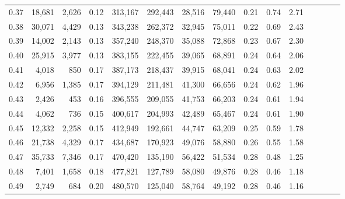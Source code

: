 \begin{tabular}{rrrcrrrrrrrrrrr}
0.37 &  18,681 &  2,626 &                                       0.12 &  313,167 &  292,443 &   28,516 &   79,440 &  0.21 &  0.74 &                         2.71 \\
0.38 &  30,071 &  4,429 &                                       0.13 &  343,238 &  262,372 &   32,945 &   75,011 &  0.22 &  0.69 &                         2.43 \\
0.39 &  14,002 &  2,143 &                                       0.13 &  357,240 &  248,370 &   35,088 &   72,868 &  0.23 &  0.67 &                         2.30 \\
0.40 &  25,915 &  3,977 &                                       0.13 &  383,155 &  222,455 &   39,065 &   68,891 &  0.24 &  0.64 &                         2.06 \\
0.41 &   4,018 &    850 &                                       0.17 &  387,173 &  218,437 &   39,915 &   68,041 &  0.24 &  0.63 &                         2.02 \\
0.42 &   6,956 &  1,385 &                                       0.17 &  394,129 &  211,481 &   41,300 &   66,656 &  0.24 &  0.62 &                         1.96 \\
0.43 &   2,426 &    453 &                                       0.16 &  396,555 &  209,055 &   41,753 &   66,203 &  0.24 &  0.61 &                         1.94 \\
0.44 &   4,062 &    736 &                                       0.15 &  400,617 &  204,993 &   42,489 &   65,467 &  0.24 &  0.61 &                         1.90 \\
0.45 &  12,332 &  2,258 &                                       0.15 &  412,949 &  192,661 &   44,747 &   63,209 &  0.25 &  0.59 &                         1.78 \\
0.46 &  21,738 &  4,329 &                                       0.17 &  434,687 &  170,923 &   49,076 &   58,880 &  0.26 &  0.55 &                         1.58 \\
0.47 &  35,733 &  7,346 &                                       0.17 &  470,420 &  135,190 &   56,422 &   51,534 &  0.28 &  0.48 &                         1.25 \\
0.48 &   7,401 &  1,658 &                                       0.18 &  477,821 &  127,789 &   58,080 &   49,876 &  0.28 &  0.46 &                         1.18 \\
0.49 &   2,749 &    684 &                                       0.20 &  480,570 &  125,040 &   58,764 &   49,192 &  0.28 &  0.46 &                         1.16 \\

\end{tabular}
